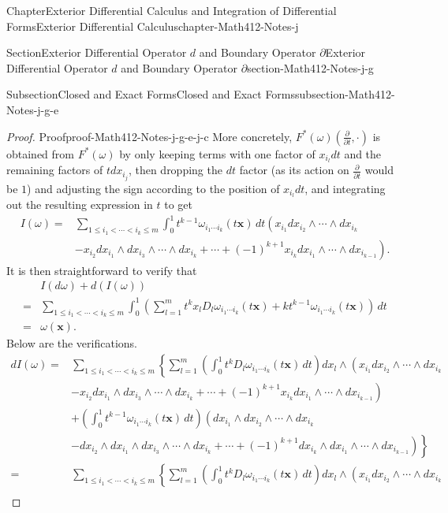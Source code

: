 \documentclass[oneside,10pt,]{book}
\numberwithin{equation}{section}
\newcommand{\bx}{\mathbf{x}}
\newcommand{\amp}{&}
\begin{document}
\begin{chapterptx}{Chapter}{Exterior Differential Calculus and Integration of Differential Forms}{}{Exterior Differential Calculus}{}{}{chapter-Math412-Notes-j}
\begin{sectionptx}{Section}{Exterior Differential Operator \(d\) and Boundary Operator \(\partial\)}{}{Exterior Differential Operator \(d\) and Boundary Operator \(\partial\)}{}{}{section-Math412-Notes-j-g}
\begin{subsectionptx}{Subsection}{Closed and Exact Forms}{}{Closed and Exact Forms}{}{}{subsection-Math412-Notes-j-g-e}
\begin{proof}{Proof}{}{proof-Math412-Notes-j-g-e-j-c}
More concretely, \(F^{*}(\omega)(\frac{\partial }{\partial t}, \cdot)\) is obtained from \(F^{*}(\omega)\) by only keeping terms with one factor of \(x_{i_{l}}dt\) and the remaining factors of \(t dx_{i_{j}}\), then dropping the \(dt\) factor (as its action on \(\frac{\partial }{\partial t}\) would be \(1\)) and adjusting the sign according to the position of \(x_{i_{l}}dt\), and integrating out the resulting expression in \(t\) to get%
\begin{align*}
I(\omega) 
= \amp \sum_{1\le i_{1} < \cdots < i_{k}\le m}
\int_{0}^{1} t^{k-1}\omega_{i_{1}\cdots i_{k}}(t\bx)\,dt  
\left(x_{i_{1}} dx_{i_{2}}\wedge\cdots \wedge dx_{i_{k}}\right.\\
\amp\left.- x_{i_{2}}dx_{i_{1}}\wedge dx_{i_{3}}\wedge \cdots \wedge dx_{i_{k}}+ \cdots +(-1)^{k+1} x_{i_{k}}dx_{i_{1}}\wedge\cdots \wedge dx_{i_{k-1}}\right).
\end{align*}
It is then straightforward to verify that%
\begin{align*}
\amp I(d\omega) + d\left(I(\omega)\right) \\
= \amp \sum_{1\le i_{1} < \cdots < i_{k}\le m} \int_{0}^{1}\left(\sum_{l=1}^{m}t^{k} x_{l}D_{l} \omega_{i_{1}\cdots i_{k}}(t\bx) +k t^{k-1} \omega_{i_{1}\cdots i_{k}}(t\bx)\right)\, dt \\
= \amp \omega(\bx).
\end{align*}
Below are the verifications.%
\begin{align*}
dI(\omega) 
= \amp \sum_{1\le i_{1} < \cdots < i_{k}\le m} \left\{\sum_{l=1}^{m}
\left( \int_{0}^{1} t^{k}D_{l}\omega_{i_{1}\cdots i_{k}}(t\bx)\,dt\right) dx_{l}\wedge
\left(x_{i_{1}} dx_{i_{2}}\wedge\cdots \wedge dx_{i_{k}} \right. \right.\\
\amp\left. - x_{i_{2}}dx_{i_{1}}\wedge dx_{i_{3}}\wedge \cdots \wedge dx_{i_{k}}+ \cdots +(-1)^{k+1} x_{i_{k}}dx_{i_{1}}\wedge\cdots \wedge dx_{i_{k-1}}\right)\\
\amp +\left(\int_{0}^{1} t^{k-1}\omega_{i_{1}\cdots i_{k}}(t\bx)\,dt\right) 
\left(d x_{i_{1}}\wedge dx_{i_{2}}\wedge\cdots \wedge dx_{i_{k}} \right.\\
\amp \left. \left.- dx_{i_{2}}\wedge dx_{i_{1}}\wedge dx_{i_{3}}\wedge \cdots \wedge dx_{i_{k}}+ \cdots +(-1)^{k+1} dx_{i_{k}}\wedge dx_{i_{1}}\wedge\cdots \wedge dx_{i_{k-1}}\right)\right\}\\
= \amp \sum_{1\le i_{1} < \cdots < i_{k}\le m} \left\{\sum_{l=1}^{m}
\left( \int_{0}^{1} t^{k}D_{l}\omega_{i_{1}\cdots i_{k}}(t\bx)\,dt\right) dx_{l}\wedge
\left(x_{i_{1}} dx_{i_{2}}\wedge\cdots \wedge dx_{i_{k}}\right. \right.\\

\end{align*}
\end{proof}
\end{subsectionptx}
\end{sectionptx}
\end{chapterptx}
\end{document}
